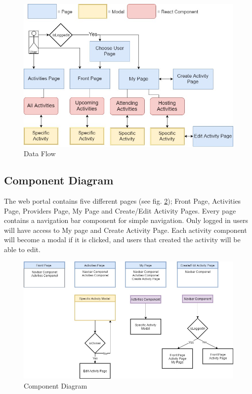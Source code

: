 \begin{figure}[H]
\centering
    \includegraphics[width=\textwidth]{fig/dataFlow}
\caption{Data Flow}
\label{Data_Flow_Diagram}
\end{figure}

\subsection{Component Diagram}
The web portal contains five different pages (see fig. \ref{Component_Diagram}); Front Page, Activities Page, Providers Page, My Page and Create/Edit Activity Pages. Every page contains a navigation bar component for simple navigation. Only logged in users will have access to My page and Create Activity Page. Each activity component will become a modal if it is clicked, and users that created the activity will be able to edit.

\begin{figure}[H]
\centering
    \includegraphics[width=\textwidth]{fig/Component_diagram}
\caption{Component Diagram}
\label{Component_Diagram}
\end{figure}

